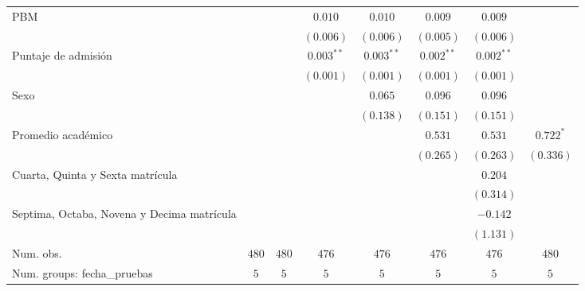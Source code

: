 \begin{table}
\begin{center}
\begin{tabular}{l c c c c c c c}
PBM                                                 &           &           & $0.010$      & $0.010$      & $0.009$      & $0.009$      &             \\
                                                    &           &           & $(0.006)$    & $(0.006)$    & $(0.005)$    & $(0.006)$    &             \\
Puntaje de admisión                                 &           &           & $0.003^{**}$ & $0.003^{**}$ & $0.002^{**}$ & $0.002^{**}$ &             \\
                                                    &           &           & $(0.001)$    & $(0.001)$    & $(0.001)$    & $(0.001)$    &             \\
Sexo                                                &           &           &              & $0.065$      & $0.096$      & $0.096$      &             \\
                                                    &           &           &              & $(0.138)$    & $(0.151)$    & $(0.151)$    &             \\
Promedio académico                                  &           &           &              &              & $0.531$      & $0.531$      & $0.722^{*}$ \\
                                                    &           &           &              &              & $(0.265)$    & $(0.263)$    & $(0.336)$   \\
Cuarta, Quinta y Sexta matrícula                    &           &           &              &              &              & $0.204$      &             \\
                                                    &           &           &              &              &              & $(0.314)$    &             \\
Septima, Octaba, Novena y Decima matrícula          &           &           &              &              &              & $-0.142$     &             \\
                                                    &           &           &              &              &              & $(1.131)$    &             \\
\hline
Num. obs.                                           & $480$     & $480$     & $476$        & $476$        & $476$        & $476$        & $480$       \\
Num. groups: fecha\_pruebas                         & $5$       & $5$       & $5$          & $5$          & $5$          & $5$          & $5$         \\

\end{tabular}
\end{center}
\end{table}

